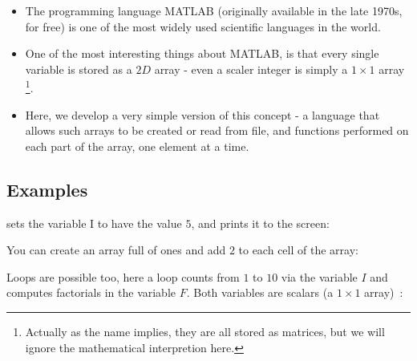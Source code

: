 
\begin{itemize}
\item The programming language MATLAB (originally available in the late
1970s, for free) is one of the most widely used scientific languages in
the world.
\item One of the most interesting things about MATLAB, is that every
single variable is stored as a $2D$ array - even a scaler integer
is simply a $1\times1$ array \footnote{Actually as the name implies,
they are all stored as matrices, but we will ignore the mathematical
interpretion here.}.
\item Here, we develop a very simple version of this concept - a language
that allows such arrays to be created or read from file, and functions performed
on each part of the array, one element at a time.
\end{itemize}

\subsection*{Examples}




sets the variable I to have the value $5$, and prints it to the screen:





You can create an array full of ones and add $2$ to each cell of the array:





Loops are possible too, here a loop counts from $1$ to $10$ via the variable $I$ and computes factorials in the variable $F$. Both variables are scalars (a $1\times1$ array)~:



